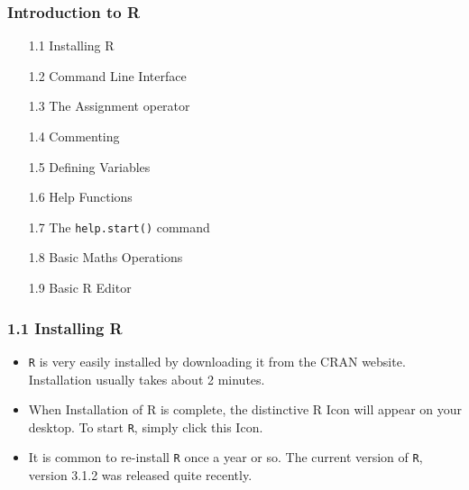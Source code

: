 \documentclass{beamer}
\begin{document}
 	
 	
 	
 	
 	
 	\begin{frame}
 		\frametitle{Introduction to R}
 		\begin{itemize}
 			\item[1.1] Installing R      
 			\item[1.2] Command Line Interface     
 			\item[1.3] The Assignment operator     
 			\item[1.4] Commenting      
 			\item[1.5] Defining Variables     
 			\item[1.6] Help Functions      
 			\item[1.7] The \texttt{help.start()} command     
 			\item[1.8] Basic Maths Operations     
 			\item[1.9] Basic R Editor      
 		\end{itemize}
 	\end{frame}
 	\begin{frame}
 		\frametitle{1.1 Installing R}
 		\begin{itemize}
 			\item \texttt{R} is very easily installed by downloading it from the CRAN website. Installation usually takes
 			about 2 minutes. 
 			\item When Installation of R is complete, the distinctive R Icon will appear on your
 			desktop. To start \texttt{R}, simply click this Icon. 
 			\item It is common to re-install \texttt{R} once a year or so. The
 			current version of \texttt{R}, version 3.1.2 was released quite recently.
 		\end{itemize}
 		
 	\end{frame}
 	
\end{document}
